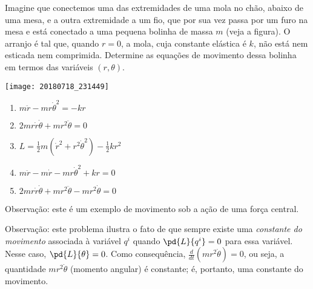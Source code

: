 \begin{question}
  	Imagine que conectemos uma das extremidades de uma mola no chão, abaixo de uma mesa, e a outra extremidade a um fio, que por sua vez passa por um furo na mesa e está conectado a uma pequena bolinha de massa $m$ (veja a figura).
  	O arranjo é tal que, quando $r = 0$, a mola, cuja constante elástica é $k$, não está nem esticada nem comprimida.
    Determine as equações de movimento dessa bolinha em termos das variáveis $(r, \theta)$.

    \begin{center}
      \texttt{[image: 20180718\_231449]}
    \end{center}

    \begin{enumerate}
      \item $m\ddot r - mr\dot\theta^2 = -kr$ \rightanswer
      \item $2mr\dot r\dot\theta + mr^2\ddot \theta = 0$ \rightanswer
      \item $L = \frac{1}{2}m\left(\dot r^2 + r^2\dot\theta^2\right) - \frac{1}{2}kr^2$
      \item $m\ddot r - m\dot r - mr\dot\theta^2 + kr = 0$
      \item $2mr\dot r\dot\theta + mr^2\ddot \theta  - mr^2\dot\theta= 0$
    \end{enumerate}

    \bigskip
    \begin{compactdesc}
    	\item[Observação:] este é um exemplo de movimento sob a ação de uma força central.
    	\item[Observação:] este problema ilustra o fato de que sempre existe uma \emph{constante do movimento} associada à variável $q^i$ quando $\pd{L}{q^i} = 0$ para essa variável.
    	Nesse caso, $\pd{L}{\theta} = 0$.
    	Como consequência, $\frac{d}{dt}\left(mr^2\dot \theta\right) = 0$, ou seja, a quantidade $mr^2\dot \theta$ (momento angular) é constante; é, portanto, uma constante do movimento.
    \end{compactdesc}


\end{question}
